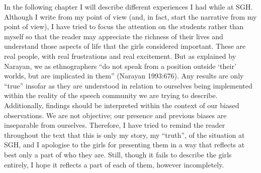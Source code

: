 In the following chapter I will describe different experiences I had while at SGH.  Although I write from my point of view (and, in fact, start the narrative from my point of view), I have tried to focus the attention on the students rather than myself so that the reader may appreciate the richness of their lives and understand those aspects of life that the girls considered important.  These are real people, with real frustrations and real excitement.  But as explained by Narayan, we as ethnographers ``do not speak from a position outside `their' worlds, but are implicated in them'' (Narayan 1993:676).  Any results are only ``true'' insofar as they are understood in relation to ourselves being implemented within the reality of the speech community we are trying to describe.  Additionally, findings should be interpreted within the context of our biased observations.  We are not objective; our presence and previous biases are inseparable from ourselves.  Therefore, I have tried to remind the reader throughout the text that this is only my story, my ``truth'', of the situation at SGH, and I apologise to the girls for presenting them in a way that reflects at best only a part of who they are.  Still, though it fails to describe the girls entirely, I hope it reflects a part of each of them, however incompletely.


